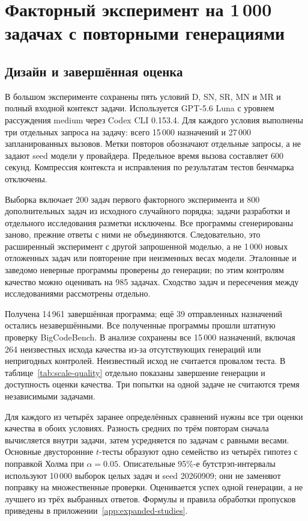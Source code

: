 \section{Факторный эксперимент на 1\,000 задачах с повторными генерациями}
\label{sec:scale-results}
\subsection{Дизайн и завершённая оценка}
В большом эксперименте сохранены пять условий D, SN, SR, MN и MR и полный входной контекст задачи. Используется GPT-5.6 Luna с уровнем рассуждения medium через Codex CLI 0.153.4. Для каждого условия выполнены три отдельных запроса на задачу: всего 15\,000 назначений и 27\,000 запланированных вызовов. Метки повторов обозначают отдельные запросы, а не задают seed модели у провайдера. Предельное время вызова составляет 600 секунд. Компрессия контекста и исправления по результатам тестов бенчмарка отключены.

Выборка включает 200 задач первого факторного эксперимента и 800 дополнительных задач из исходного случайного порядка; задачи разработки и отдельного исследования разметки исключены. Все программы сгенерированы заново, прежние ответы с ними не объединяются. Следовательно, это расширенный эксперимент с другой запрошенной моделью, а не 1\,000 новых отложенных задач или повторение при неизменных весах модели. Эталонные и заведомо неверные программы проверены до генерации; по этим контролям качество можно оценивать на 985 задачах. Сходство задач и пересечения между исследованиями рассмотрены отдельно.

Получена 14\,961 завершённая программа; ещё 39 отправленных назначений остались незавершёнными. Все полученные программы прошли штатную проверку BigCodeBench. В анализе сохранены все 15\,000 назначений, включая 264 неизвестных исхода качества из-за отсутствующих генераций или непригодных контролей. Неизвестный исход не считается провалом теста. В таблице~\ref{tab:scale-quality} отдельно показаны завершение генерации и доступность оценки качества. Три попытки на одной задаче не считаются тремя независимыми задачами.


Для каждого из четырёх заранее определённых сравнений нужны все три оценки качества в обоих условиях. Разность средних по трём повторам сначала вычисляется внутри задачи, затем усредняется по задачам с равными весами. Основные двусторонние $t$-тесты образуют одно семейство из четырёх гипотез с поправкой Холма при $\alpha=0.05$. Описательные 95\%-е бутстрэп-интервалы используют 10\,000 выборок целых задач и seed 20260909; они не заменяют поправку на множественные проверки. Оценивается успех одной генерации, а не лучшего из трёх выбранных ответов. Формулы и правила обработки пропусков приведены в приложении~\ref{app:expanded-studies}.

